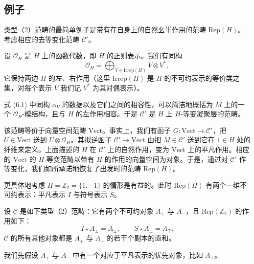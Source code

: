 \documentclass[11pt,a4paper]{article}
\begin{document}
\subsection{例子}

类型（2）范畴的最简单例子是带有在自身上的自然幺半作用的范畴 $\mathrm{Rep}(H)$。考虑相应的去等变化范畴 $\mathcal{C}'$。


设 $\mathcal{O}_H$ 是 $H$ 上的函数代数，即 $H$ 的正则表示。我们有同构
\[
\mathcal{O}_H = \bigoplus_{V\in\mathrm{Irrep}(H)} V\otimes V^{*},
\]
它保持两边 $H$ 的左、右作用（这里 $\mathrm{Irrep}(H)$ 是 $H$ 的不可约表示的等价类之集，对每个表示 $V$ 我们记 $V^{*}$ 为其对偶表示）。

式 (6.1) 中同构 $\alpha_V$ 的数据以及它们之间的相容性，可以简洁地概括为 $M$ 上的一个 $\mathcal{O}_H$-模结构，且与 $H$ 的左作用相容。于是 $\mathcal{C}'$ 是 $H$ 上 $H$-等变凝聚层的范畴。

该范畴等价于向量空间范畴 $\mathrm{Vect}$。事实上，我们有函子 $G : \mathrm{Vect}\to\mathcal{C}'$，把 $U\in\mathrm{Vect}$ 送到 $U\otimes\mathcal{O}_H$。其拟逆函子 $\mathcal{C}'\to\mathrm{Vect}$ 由把 $M\in\mathcal{C}'$ 送到它在 $1\in H$ 处的纤维来定义。上面描述的 $H$ 在 $\mathcal{C}'$ 上的自然作用，变为 $\mathrm{Vect}$ 上的平凡作用。相应的 $\mathrm{Vect}$ 的 $H$-等变范畴以带有 $H$ 的作用的向量空间为对象。于是，通过对 $\mathcal{C}'$ 作等变化，我们如所承诺地恢复了出发时的范畴 $\mathrm{Rep}(H)$。


更具体地考虑 $H = \mathbb{Z}_2 = \{1,-1\}$ 的情形是有益的。此时 $\mathrm{Rep}(H)$ 有两个一维不可约表示：平凡表示 $I$ 与符号表示 $S$。

设 $\mathcal{C}$ 是如下类型（2）范畴：它有两个不可约对象 $A_+$ 与 $A_-$，且 $\mathrm{Rep}(\mathbb{Z}_2)$ 的作用如下：
\begin{equation}\tag{6.3}
I\star A_\pm = A_\pm,\qquad S\star A_\pm = A_\mp.
\end{equation}
$\mathcal{C}$ 的所有其他对象都是 $A_+$ 与 $A_-$ 的若干个副本的直和。

我们先假设 $A_+$ 与 $A_-$ 中有一个对应于平凡表示的优先对象，比如 $A_+$。
\end{document}

